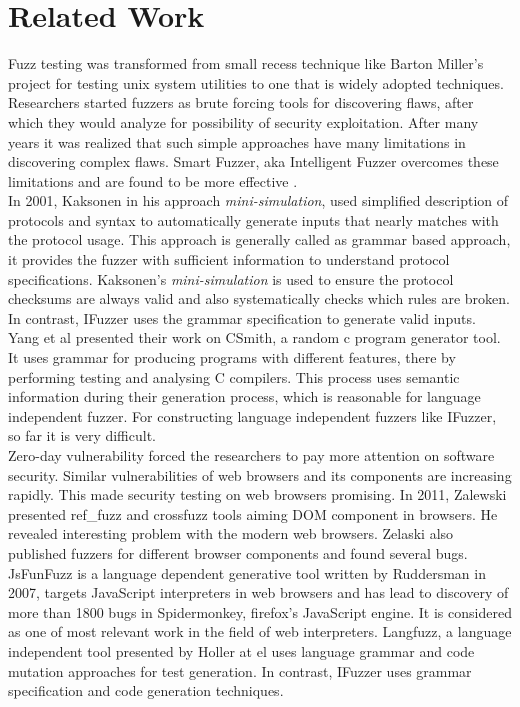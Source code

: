\documentclass{acm_proc_article-sp}
\begin{document}
\section{Related Work}
Fuzz testing was transformed from small recess technique like Barton Miller's \cite{Miller89} project for testing unix system utilities to one that is widely adopted techniques. \\
\indent Researchers started fuzzers as brute forcing tools \cite{clarke2009fuzzing} for discovering flaws, after which they would analyze for possibility of security exploitation. After many years it was realized that such simple approaches have many limitations in discovering complex flaws. Smart Fuzzer, aka Intelligent Fuzzer overcomes these limitations and are found to be more effective \cite{miller2007smart}. \\
\indent In 2001, Kaksonen \cite{Kaksonen} in his approach \textit{mini-simulation}, used simplified description of protocols and syntax to automatically generate inputs that nearly matches with the protocol usage. This approach is generally called as grammar based approach, it provides the fuzzer with sufficient information to understand protocol specifications. Kaksonen's \textit{mini-simulation} is used to ensure the protocol checksums are always valid and also systematically checks which rules are broken. In contrast, IFuzzer uses the grammar specification to generate valid inputs.\\
\indent Yang et al \cite{Yang} presented their work on CSmith, a random c program generator tool. It uses grammar for producing programs with different features, there by performing testing and analysing C compilers. This process uses semantic information during their generation process, which is reasonable for language independent fuzzer. For constructing language independent fuzzers like IFuzzer, so far it is very difficult.\\
\indent Zero-day vulnerability forced the researchers to pay more attention on software security. Similar vulnerabilities of web browsers and its components are increasing rapidly. This made security testing on web browsers promising. In 2011, Zalewski presented ref\_fuzz \cite{Zelaski08} and cross\-fuzz \cite{Zelaski11} tools aiming DOM component in browsers. He revealed interesting problem with the modern web browsers. Zelaski also published fuzzers for different browser components and found several bugs. 
\indent JsFunFuzz \cite{Jesse07} is a language dependent generative tool written by Ruddersman in 2007, targets JavaScript interpreters in web browsers and has lead to discovery of more than 1800 bugs in Spidermonkey, firefox's JavaScript engine. It is considered as one of most relevant work in the field of web interpreters. Langfuzz, a language independent tool presented by Holler at el \cite{Holler11} uses language grammar and code mutation approaches for test generation. In contrast, IFuzzer uses grammar specification and code generation techniques.\\
\end{document}
